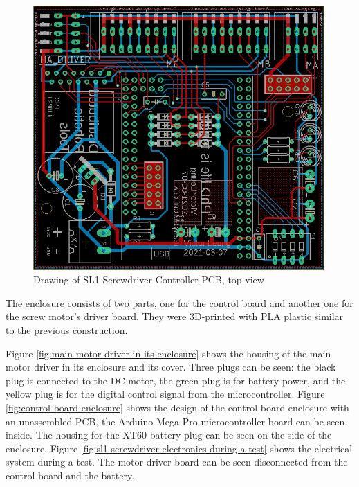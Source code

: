 \begin{figure}[!h]
    \centering
    \includegraphics[width=0.99\textwidth]{images/7a/img64.png}
    \caption{Drawing of SL1 Screwdriver Controller PCB, top view}
    \label{fig:pcb-for-the-sl1}
\end{figure}

The enclosure consists of two parts, one for the control board and another one for the screw motor’s driver board. They were 3D-printed with PLA plastic similar to the previous construction. 

Figure \ref{fig:main-motor-driver-in-its-enclosure} shows the housing of the main motor driver in its enclosure and its cover. Three plugs can be seen: the black plug is connected to the DC motor, the green plug is for battery power, and the yellow plug is for the digital control signal from the microcontroller. Figure \ref{fig:control-board-enclosure} shows the design of the control board enclosure with an unassembled PCB, the Arduino Mega Pro microcontroller board can be seen inside. The housing for the XT60 battery plug can be seen on the side of the enclosure. 
Figure \ref{fig:sl1-screwdriver-electronics-during-a-test} shows the electrical system during a test. The motor driver board can be seen disconnected from the control board and the battery.

